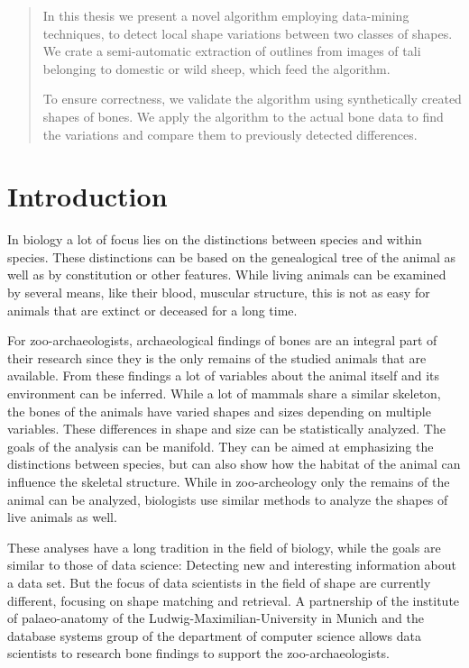 \documentclass[pdftex,12pt,a4paper]{report}
\begin{document}
\deckblatt

\erklaerung

\begin{abstract}
In this thesis we present a novel algorithm employing data-mining techniques, to detect local shape variations between two classes of shapes. We crate a semi-automatic extraction of outlines from images of tali belonging to domestic or wild sheep, which feed the algorithm.

To ensure correctness, we validate the algorithm using synthetically created shapes of bones. We apply the algorithm to the actual bone data to find the variations and compare them to previously detected differences.
\end{abstract}

\tableofcontents

\chapter{Introduction}

In biology a lot of focus lies on the distinctions between species and within species. These distinctions can be based on the genealogical tree of the animal as well as by constitution or other features. While living animals can be examined by several means, like their blood, muscular structure, this is not as easy for animals that are extinct or deceased for a long time.

For zoo-archaeologists, archaeological findings of bones are an integral part of their research since they is the only remains of the studied animals that are available. From these findings a lot of variables about the animal itself and its environment can be inferred. While a lot of mammals share a similar skeleton, the bones of the animals have varied shapes and sizes depending on multiple variables. These differences in shape and size can be statistically analyzed. The goals of the analysis can be manifold. They can be aimed at emphasizing the distinctions between species, but can also show how the habitat of the animal can influence the skeletal structure. While in zoo-archeology only the remains of the animal can be analyzed, biologists use similar methods to analyze the shapes of live animals as well.

These analyses have a long tradition in the field of biology, while the goals are similar to those of data science: Detecting new and interesting information about a data set. But the focus of data scientists in the field of shape are currently different, focusing on shape matching and retrieval. A partnership of the institute of palaeo-anatomy of the Ludwig-Maximilian-University in Munich and the database systems group of the department of computer science allows data scientists to research bone findings to support the zoo-archaeologists.
\end{document}

